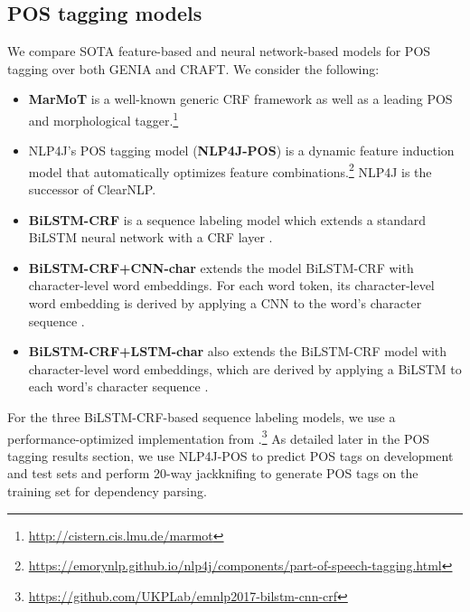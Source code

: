 \documentclass[twocolumn,hyperref]{bmcart}\pdfoutput=1
\begin{document}
\subsection*{POS tagging models}

We compare SOTA feature-based
and neural network-based models for POS tagging over both GENIA and CRAFT. We consider the following:

\begin{itemize}

	\item \textbf{MarMoT}    \cite{mueller-schmid-schutze:2013:EMNLP} is a well-known generic CRF framework as well as a leading POS and morphological tagger.\footnote{{\url{http://cistern.cis.lmu.de/marmot}}}

	\item {NLP4J}'s   POS  tagging model \cite{choi:2016:N16-1} (\textbf{NLP4J-POS}) is a dynamic feature induction model that automatically optimizes feature combinations.\footnote{{\url{https://emorynlp.github.io/nlp4j/components/part-of-speech-tagging.html}}} NLP4J is the successor of ClearNLP.

    \item \textbf{BiLSTM-CRF}  \cite{HuangXY15} is a sequence labeling model which extends a standard BiLSTM neural network \cite{Schuster1997BRN,HochreiterSchmidhuber1997b} with a CRF layer \cite{Lafferty:2001}.
    
    \item \textbf{BiLSTM-CRF+CNN-char} extends the  model BiLSTM-CRF with character-level word embeddings. For each word token, its  character-level word embedding is derived by applying a CNN to the word's character sequence  \cite{ma-hovy:2016:P16-1}. 
    
    \item \textbf{BiLSTM-CRF+LSTM-char}   also extends the BiLSTM-CRF model with character-level word embeddings, which are derived by applying a BiLSTM to each word's character sequence \cite{lample-EtAl:2016:N16-1}.
    
\end{itemize}

For the three BiLSTM-CRF-based sequence labeling models, we use a performance-optimized implementation from \cite{reimers-gurevych:2017:EMNLP2017}.\footnote{\url{https://github.com/UKPLab/emnlp2017-bilstm-cnn-crf}}
As detailed later in the POS tagging results section,  
we use NLP4J-POS to predict POS tags on development and test sets and perform 20-way jackknifing \cite{koo-carreras-collins:2008:ACLMain} to generate POS tags on the training set for dependency parsing.  
\end{document}
